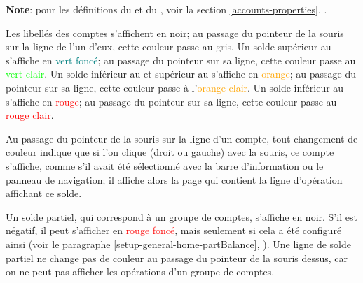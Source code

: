
\textbf{Note}: pour les définitions du  et du , voir la section \vref{accounts-properties}, .

Les libellés des comptes s'affichent en \textcolor{black}{noir}; au passage du pointeur de la souris sur la ligne de l'un d'eux, cette couleur passe au \textcolor{gray}{gris}.
Un solde supérieur au  s'affiche en \textcolor{teal}{vert foncé}; au passage du pointeur sur sa ligne, cette couleur passe au \textcolor{lime}{vert clair}.
Un solde inférieur au  et supérieur au  s'affiche en \textcolor{orange}{orange}; au passage du pointeur sur sa ligne, cette couleur passe à l'\textcolor{orange}{orange clair}.
Un solde inférieur au  s'affiche en \textcolor{red}{rouge}; au passage du pointeur sur sa ligne, cette couleur passe au \textcolor{red}{rouge clair}.

Au passage du pointeur de la souris sur la ligne d'un compte, tout changement de couleur indique que si l'on clique (droit ou gauche) avec la souris, ce compte s'affiche, comme s'il avait été sélectionné avec la barre d'information ou le panneau de navigation; il affiche alors la page qui contient la ligne d'opération affichant ce solde.

Un solde partiel, qui correspond à un groupe de comptes, s'affiche en \textcolor{black}{noir}. S'il est négatif, il peut s'afficher en \textcolor{red}{rouge foncé}, mais seulement si cela a été configuré ainsi (voir le paragraphe \vref{setup-general-home-partBalance}, ). Une ligne de solde partiel ne change pas de couleur au passage du pointeur de la souris dessus, car on ne peut pas afficher les opérations d'un groupe de comptes.

